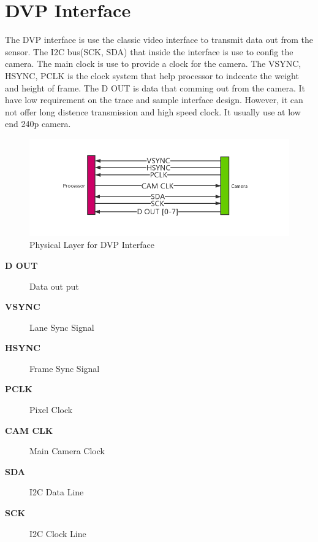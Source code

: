 \documentclass[12pt,article]{memoir}
\begin{document}
\section{DVP Interface} 
The DVP interface is use the classic video interface to transmit data out from the sensor. The I2C bus(SCK, SDA) that inside the interface is use to config the camera. The main clock is use to provide a clock for the camera. The VSYNC, HSYNC, PCLK is the clock system that help processor to indecate the weight and height of frame. The D OUT is data that comming out from the camera. It have low requirement on the trace and sample interface design. However, it can not offer long distence transmission and high speed clock. It usually use at low end 240p camera.
\begin{figure}[htp]
\includegraphics[width=\textwidth]{img/DR00002_DVP.png}
 \caption{Physical Layer for DVP Interface}	
\end{figure}
\begin{description}
	\item[\textbf{D OUT}]Data out put
	\item[\textbf{VSYNC}]Lane Sync Signal
	\item[\textbf{HSYNC}]Frame Sync Signal
	\item[\textbf{PCLK}]Pixel Clock
	\item[\textbf{CAM CLK}]Main Camera Clock
	\item[\textbf{SDA}]I2C Data Line
	\item[\textbf{SCK}]I2C Clock Line
\end{description}
\newpage
\end{document}
